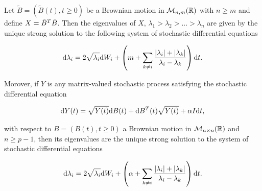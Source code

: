 \begin{corollary}
    Let $\tilde B = (\tilde B(t), t\ge 0)$ be a Brownian motion in $\mathcal M_{n,m}(\mathbb R)$ with $n\ge m$ and define $X = \tilde B^T\tilde B$. Then the eigenvalues of $X$, $\lambda_1 > \lambda_2 > ... > \lambda_n$ are given by the unique strong solution to the following system of stochastic differential equations

    \begin{equation*}
        \mathrm d \lambda_i = 2 \sqrt{\lambda_i} \mathrm d W_i + \left(m + \sum_{k\neq i} \frac{\lvert \lambda_i \rvert + \lvert \lambda_k \rvert}{ \lambda_i - \lambda_k} \right) \mathrm d t.
    \end{equation*}

    Morover, if $Y$ is any matrix-valued stochastic process satisfying the stochastic differential equation

    \begin{equation*}
        \mathrm d Y(t) = \sqrt{Y(t)} \mathrm d B(t) + \mathrm d B^T(t) \sqrt{Y(t)} + \alpha I \mathrm d t,
    \end{equation*}

    with respect to $B = (B(t), t \ge 0)$ a Brownian motion in $\mathcal M_{n\times n}(\mathbb R)$ and $n\ge p-1$, then its eigenvalues are the unique strong solution to the system of stochastic differential equations

    \begin{equation} \label{eq:wishart}
        \mathrm d \lambda_i = 2 \sqrt{\lambda_i} \mathrm d W_i + \left(\alpha + \sum_{k\neq i} \frac{\lvert \lambda_i \rvert + \lvert \lambda_k \rvert}{ \lambda_i - \lambda_k} \right) \mathrm d t.
    \end{equation}

\end{corollary}

